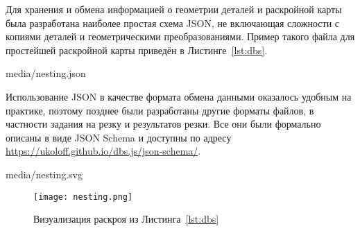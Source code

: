 Для хранения и обмена информацией о геометрии деталей
и раскройной карты
была разработана наиболее простая схема JSON,
не включающая сложности с копиями деталей и геометрическими
преобразованиями.
Пример такого файла для простейшей раскройной карты
приведён в Листинге~\ref{lst:dbs}.


    {media/nesting.json}

Использование JSON
в качестве формата обмена данными
оказалось удобным на практике,
поэтому позднее были разработаны другие
форматы файлов, в частности
задания на резку и результатов резки.
Все они были формально описаны в
виде JSON Schema
\autocite*[]{bi:json-schema}
и доступны по адресу
\url{https://ukoloff.github.io/dbs.js/json-schema/}.




  {media/nesting.svg}


\begin{figure}
  \centering
  \texttt{[image: nesting.png]}
  \label{fig:nesting}
  \caption{Визуализация раскроя из Листинга~\ref{lst:dbs}}
\end{figure}
